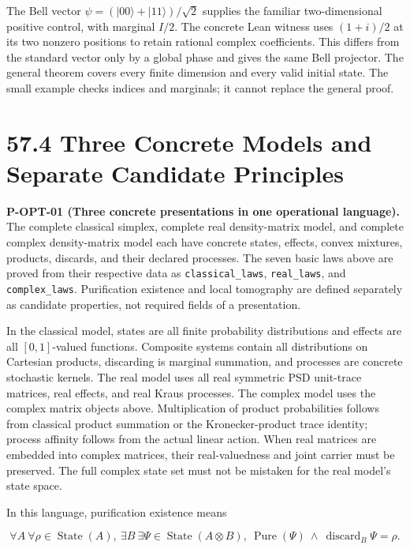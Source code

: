 \documentclass[
  11pt,
  oneside]{book}
\begin{document}
The Bell vector \(\psi=(|00\rangle+|11\rangle)/\sqrt2\) supplies the
familiar two-dimensional positive control, with marginal \(I/2\). The
concrete Lean witness uses \((1+i)/2\) at its two nonzero positions to
retain rational complex coefficients. This differs from the standard
vector only by a global phase and gives the same Bell projector. The
general theorem covers every finite dimension and every valid initial
state. The small example checks indices and marginals; it cannot replace
the general proof.

\section{57.4 Three Concrete Models and Separate Candidate Principles}

\label{p-opt-01}{}

\textbf{P-OPT-01 (Three concrete presentations in one operational
language).} The complete classical simplex, complete real density-matrix
model, and complete complex density-matrix model each have concrete
states, effects, convex mixtures, products, discards, and their declared
processes. The seven basic laws above are proved from their respective
data as \texttt{classical\_\allowbreak laws}, \texttt{real\_\allowbreak laws}, and
\texttt{complex\_\allowbreak laws}. Purification existence and local tomography are
defined separately as candidate properties, not required fields of a
presentation.

In the classical model, states are all finite probability distributions
and effects are all \([0,1]\)-valued functions. Composite systems
contain all distributions on Cartesian products, discarding is marginal
summation, and processes are concrete stochastic kernels. The real model
uses all real symmetric PSD unit-trace matrices, real effects, and real
Kraus processes. The complex model uses the complex matrix objects
above. Multiplication of product probabilities follows from classical
product summation or the Kronecker-product trace identity; process
affinity follows from the actual linear action. When real matrices are
embedded into complex matrices, their real-valuedness and joint carrier
must be preserved. The full complex state set must not be mistaken for
the real model's state space.

In this language, purification existence means

\[
\forall A\ \forall\rho\in\operatorname{State}(A),\
\exists B\ \exists\Psi\in\operatorname{State}(A\otimes B),\
\operatorname{Pure}(\Psi)\ \land\ \operatorname{discard}_{B}\Psi=\rho.
\]
\end{document}
